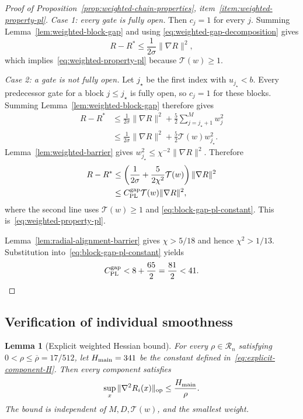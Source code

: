 \documentclass{article}
\newtheorem{lemma}[theorem]{Lemma}
\theoremstyle{definition}
\newcommand{\op}{\mathrm{op}}
\begin{document}
\begin{proof}[Proof of Proposition~\ref{prop:weighted-chain-properties},
item~\ref{item:weighted-property-pl}]
\emph{Case 1: every gate is fully open.}
Then $c_j=1$ for every $j$.
Summing Lemma~\ref{lem:weighted-block-gap} and using
\eqref{eq:weighted-gap-decomposition} gives
\begin{equation}
 R-R^*\le\frac1{2\sigma}\|\nabla R\|^2,
\end{equation}
which implies~\eqref{eq:weighted-property-pl} because $\mathcal T(w)\ge1$.

\emph{Case 2: a gate is not fully open.}
Let $j_\star$ be the first index with $u_{j_\star}<b$.  Every
predecessor gate for a block $j\le j_\star$ is fully open, so
$c_j=1$ for these blocks.  Summing Lemma~\ref{lem:weighted-block-gap} therefore
gives
\begin{equation}
\begin{aligned}
 R-R^*
 &\le\frac1{2\sigma}\|\nabla R\|^2
 +\frac52\sum_{j=j_\star+1}^Mw_j^2\\
 &\le\frac1{2\sigma}\|\nabla R\|^2
 +\frac52\mathcal T(w)w_{j_\star}^2.
\end{aligned}
\end{equation}
Lemma~\ref{lem:weighted-barrier} gives
$w_{j_\star}^2\le\chi^{-2}\|\nabla R\|^2$.  Therefore
\begin{equation}
\begin{aligned}
 R-R^*
 &\le\left(\frac1{2\sigma}
 +\frac{5}{2\chi^2}\mathcal T(w)\right)
 \|\nabla R\|^2\\
 &\le C_{\rm PL}^{\rm gap}\mathcal T(w)\|\nabla R\|^2,
\end{aligned}
\end{equation}
where the second line uses $\mathcal T(w)\ge1$ and
\eqref{eq:block-gap-pl-constant}.  This is~\eqref{eq:weighted-property-pl}.

Lemma~\ref{lem:radial-alignment-barrier} gives $\chi>5/18$ and hence
$\chi^2>1/13$.  Substitution into~\eqref{eq:block-gap-pl-constant} yields
\begin{equation}
 C_{\rm PL}^{\rm gap}
 <8+\frac{65}{2}=\frac{81}{2}<41.
\end{equation}
\end{proof}

\subsection{Verification of individual smoothness}

\begin{lemma}[Explicit weighted Hessian bound]
\label{lem:weighted-smoothness}
For every $\rho\in\mathcal R_n$ satisfying
$0<\rho\le\overline\rho=17/512$, let $H_{\rm main}=341$ be the constant
defined in~\eqref{eq:explicit-component-H}.
Then every component satisfies
\begin{equation}
 \sup_x\|\nabla^2R_i(x)\|_{\op}\le\frac {H_{\rm main}}\rho.
 \label{eq:weighted-component-smoothness}
\end{equation}
The bound is independent of $M,D,\mathcal T(w)$, and the
smallest weight.
\end{lemma}
\end{document}

